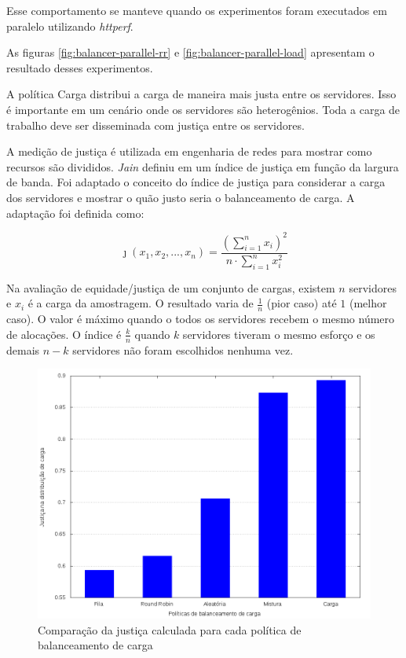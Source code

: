 Esse comportamento se manteve quando os experimentos foram executados em 
paralelo utilizando \emph{httperf}.

As figuras \ref{fig:balancer-parallel-rr} e \ref{fig:balancer-parallel-load}
apresentam o resultado desses experimentos.

A política Carga distribui a carga de maneira mais justa entre os servidores.
Isso é importante em um cenário onde os servidores são heterogênios.
Toda a carga de trabalho deve ser disseminada com justiça entre os servidores.

A medição de justiça é utilizada em engenharia de redes para mostrar como 
recursos são divididos.
\emph{Jain} definiu em \citep{jain} um índice de justiça em função da 
largura de banda.
Foi adaptado o conceito do índice de justiça para considerar a carga dos 
servidores e mostrar o quão justo seria o balanceamento de carga.
A adaptação foi definida como:


\[\jmath \left ( x_1, x_2,..., x_n \right ) = \frac{\left ( \sum_{i=1}^{n} x_i\right )^2}{n \cdot \sum_{i=1}^{n} x_i^2}\]

Na avaliação de equidade/justiça de um conjunto de cargas, existem $n$
servidores e $x_i$ é a carga da amostragem.
O resultado varia de $\frac{1}{n}$ (pior caso) até $1$ (melhor caso).
O valor é máximo quando o todos os servidores recebem o mesmo número de 
alocações.
O índice é $\frac{k}{n}$ quando $k$ servidores tiveram o mesmo esforço e 
os demais $n-k$ servidores não foram escolhidos nenhuma vez. 

\begin{figure}[htb!]
    \centering
    \includegraphics[width=0.9\linewidth]{img/balancer-fairness}
    \caption{Comparação da justiça calculada para cada política de
    balanceamento de carga}
    \label{fig:fainess}
\end{figure}


